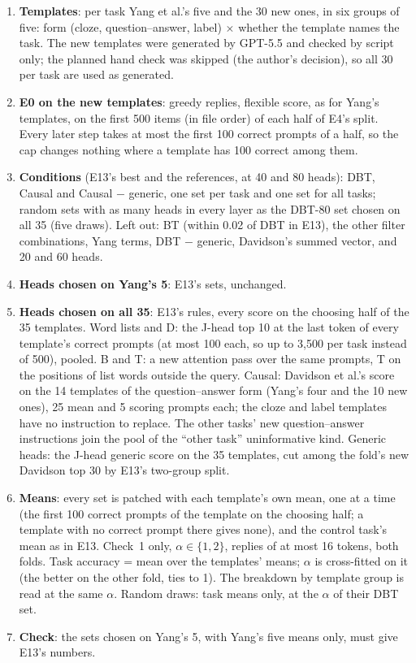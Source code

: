 \documentclass[10pt,a4paper]{article}
\begin{document}
\begin{enumerate}
\item \textbf{Templates}: per task Yang et al.'s five and the 30 new ones, in six groups of five: form (cloze, question--answer, label) $\times$ whether the template names the task. The new templates were generated by GPT-5.5 and checked by script only; the planned hand check was skipped (the author's decision), so all 30 per task are used as generated.
\item \textbf{E0 on the new templates}: greedy replies, flexible score, as for Yang's templates, on the first 500 items (in file order) of each half of E4's split. Every later step takes at most the first 100 correct prompts of a half, so the cap changes nothing where a template has 100 correct among them.
\item \textbf{Conditions} (E13's best and the references, at 40 and 80 heads): DBT, Causal and Causal $-$ generic, one set per task and one set for all tasks; random sets with as many heads in every layer as the DBT-80 set chosen on all 35 (five draws). Left out: BT (within 0.02 of DBT in E13), the other filter combinations, Yang terms, DBT $-$ generic, Davidson's summed vector, and 20 and 60 heads.
\item \textbf{Heads chosen on Yang's 5}: E13's sets, unchanged.
\item \textbf{Heads chosen on all 35}: E13's rules, every score on the choosing half of the 35 templates. Word lists and D: the J-head top 10 at the last token of every template's correct prompts (at most 100 each, so up to 3{,}500 per task instead of 500), pooled. B and T: a new attention pass over the same prompts, T on the positions of list words outside the query. Causal: Davidson et al.'s score on the 14 templates of the question--answer form (Yang's four and the 10 new ones), 25 mean and 5 scoring prompts each; the cloze and label templates have no instruction to replace. The other tasks' new question--answer instructions join the pool of the ``other task'' uninformative kind. Generic heads: the J-head generic score on the 35 templates, cut among the fold's new Davidson top 30 by E13's two-group split.
\item \textbf{Means}: every set is patched with each template's own mean, one at a time (the first 100 correct prompts of the template on the choosing half; a template with no correct prompt there gives none), and the control task's mean as in E13. Check~1 only, $\alpha\in\{1,2\}$, replies of at most 16 tokens, both folds. Task accuracy = mean over the templates' means; $\alpha$ is cross-fitted on it (the better on the other fold, ties to 1). The breakdown by template group is read at the same $\alpha$. Random draws: task means only, at the $\alpha$ of their DBT set.
\item \textbf{Check}: the sets chosen on Yang's 5, with Yang's five means only, must give E13's numbers.
\end{enumerate}
\end{document}
